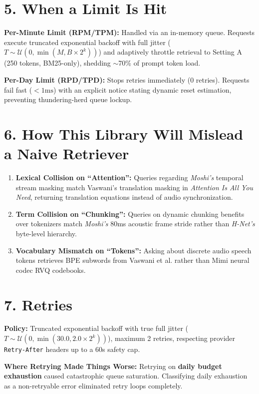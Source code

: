 \documentclass[9pt,twocolumn]{article}
\begin{document}
\section{5. When a Limit Is Hit}
\textbf{Per-Minute Limit (RPM/TPM):} Handled via an in-memory queue. Requests execute truncated exponential backoff with full jitter ($T \sim \mathcal{U}(0, \min(M, B \times 2^k))$) and adaptively throttle retrieval to Setting A (250 tokens, BM25-only), shedding $\sim$70\% of prompt token load.

\textbf{Per-Day Limit (RPD/TPD):} Stops retries immediately (0 retries). Requests fail fast ($<1\mathrm{ms}$) with an explicit notice stating dynamic reset estimation, preventing thundering-herd queue lockup.

\section{6. How This Library Will Mislead a Naive Retriever}
\begin{enumerate}
    \setlength{\itemsep}{0pt}\setlength{\parskip}{0pt}
    \item \textbf{Lexical Collision on ``Attention'':} Queries regarding \textit{Moshi's} temporal stream masking match Vaswani's translation masking in \textit{Attention Is All You Need}, returning translation equations instead of audio synchronization.
    \item \textbf{Term Collision on ``Chunking'':} Queries on dynamic chunking benefits over tokenizers match \textit{Moshi's} 80ms acoustic frame stride rather than \textit{H-Net's} byte-level hierarchy.
    \item \textbf{Vocabulary Mismatch on ``Tokens'':} Asking about discrete audio speech tokens retrieves BPE subwords from Vaswani et al. rather than Mimi neural codec RVQ codebooks.
\end{enumerate}

\section{7. Retries}
\textbf{Policy:} Truncated exponential backoff with true full jitter ($T \sim \mathcal{U}(0, \min(30.0, 2.0 \times 2^k))$), maximum 2 retries, respecting provider \texttt{Retry-After} headers up to a 60s safety cap.

\textbf{Where Retrying Made Things Worse:} Retrying on \textbf{daily budget exhaustion} caused catastrophic queue saturation. Classifying daily exhaustion as a non-retryable error eliminated retry loops completely.
\end{document}
